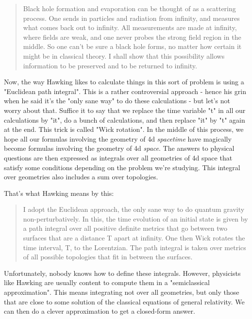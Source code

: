 \begin{quote}
     Black hole formation and evaporation can be thought of as a
     scattering process. One sends in particles and radiation from
     infinity, and measures what comes back out to infinity.  All
     measurements are made at infinity, where fields are weak, and one
     never probes the strong field region in the middle.  So one can't 
     be sure a black hole forms, no matter how certain it might be in
     classical theory.  I shall show that this possibility allows
     information to be preserved and to be returned to infinity.
\end{quote}
    

Now, the way Hawking likes to calculate things in this sort of 
problem is using a "Euclidean path integral".  This is a rather
controversial approach - hence his grin when he said it's the 
"only sane way" to do these calculations - but let's not worry about
that.   Suffice it to say that we replace the time variable "t"
in all our calculations by "it", do a bunch of calculations, and 
then replace "it" by "t" again at the end.   
This trick is called
"Wick rotation".  In the middle of this process, we hope all our 
formulas involving the geometry of 4d \emph{spacetime} have magically 
become formulas involving the geometry of 4d \emph{space}.   The answers 
to physical questions are then expressed as integrals over all 
geometries of 4d space that satisfy some conditions depending on 
the problem we're studying.   This integral over geometries also
includes a sum over topologies.  

That's what Hawking means by this:

\begin{quote}
     I adopt the Euclidean approach, the only sane way to do quantum
     gravity non-perturbatively.  In this, the time evolution of an 
     initial state is given by a path integral over all positive 
     definite metrics that go between two surfaces that are a distance 
     T apart at infinity.  One then Wick rotates the time interval, T, 
     to the Lorentzian.  The path integral is taken over metrics of 
     all possible topologies that fit in between the surfaces.  
\end{quote}
    

Unfortunately, nobody knows how to define these integrals.  However,
physicists like Hawking are usually content to compute them in a
"semiclassical approximation".  This means integrating not over all
geometries, but only those that are close to some solution of the 
classical equations of general relativity.  We can then do a clever 
approximation to get a closed-form answer.

